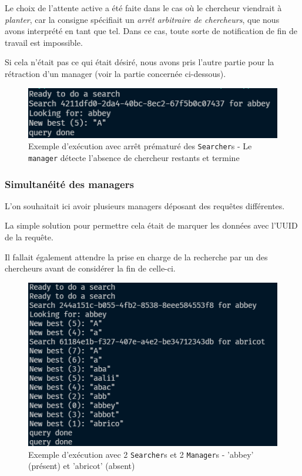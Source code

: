 \documentclass[headings=standardclasses,parskip=half]{scrartcl}
\begin{document}
Le choix de l'attente active a été faite dans le cas où le chercheur viendrait à \textit{planter}, car la consigne spécifiait un
\textit{arrêt arbitraire de chercheurs}, que nous avons interprété en tant que tel. Dans ce cas, toute sorte
de notification de fin de travail est impossible.

Si cela n'était pas ce qui était désiré, nous avons pris l'autre partie pour la rétraction d'un manager
(voir la partie concernée ci-dessous).

\begin{figure}[h]
    \centering
    \includegraphics[scale=0.5]{arret-chercheurs.png}
    \caption{Exemple d'exécution avec arrêt prématuré des \texttt{Searcher}s -
        Le \texttt{manager} détecte l'absence de chercheur restants et termine}
\end{figure}

\subsubsection{Simultanéité des managers}

L'on souhaitait ici avoir plusieurs managers déposant des requêtes différentes.

La simple solution pour permettre cela était de marquer les données avec l'UUID de la requête.

Il fallait également attendre la prise en charge de la recherche par un des chercheurs avant
de considérer la fin de celle-ci.

\begin{figure}[h]
    \centering
    \includegraphics[scale=0.5]{plusieurs-managers.png}
    \caption{Exemple d'exécution avec 2 \texttt{Searcher}s
        et 2 \texttt{Manager}s - 'abbey' (présent) et 'abricot' (absent)}
\end{figure}
\end{document}
